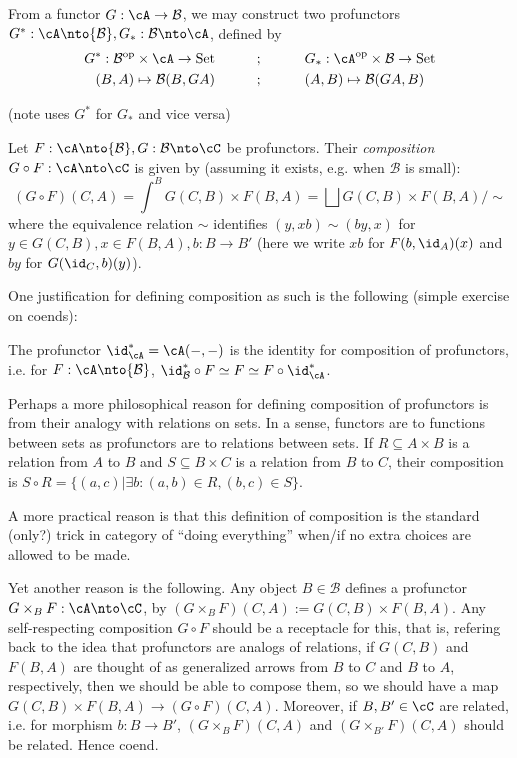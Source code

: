 \documentclass[12pt]{article}
\newcommand{\op}{{\text{op}}}
\newcommand{\cB}{{\mathcal{B}}}
\DeclareMathOperator{\Set}{Set}
\begin{document}
\begin{example}
From a functor $G: \cA \to \cB$,
we may construct two profunctors
$G^*: \cA \nto \cB, G_*: \cB \nto \cA$,
defined by
\begin{align*}
G^* : \cB^\op \times \cA \to \Set
\hspace{30pt}
&;
\hspace{30pt}
G_* : \cA^\op \times \cB \to \Set
\\
(B, A) \mapsto \cB(B, GA)
\hspace{30pt}
&;
\hspace{30pt}
(A, B) \mapsto \cB(GA, B)
\end{align*}

(note \cite{Lawvere} uses $G^*$ for $G_*$ and
vice versa)
\end{example}

\begin{definition}
Let $F: \cA \nto \cB, G: \cB \nto \cC$
be profunctors.
Their \emph{composition}
$G \circ F: \cA \nto \cC$
is given by
(assuming it exists, e.g. when $\cB$ is small):
\[
(G \circ F)(C,A) =
\int^B G(C,B) \times F(B,A)
=
\bigsqcup G(C,B) \times F(B,A) / \sim
\]
where the equivalence relation $\sim$
identifies $(y, xb) \sim (by,x)$
for $y \in G(C,B), x \in F(B,A), b: B \to B'$
(here we write $xb$ for $F(b,\id_A)(x)$
and $by$ for $G(\id_C,b)(y)$).
\end{definition}

One justification for defining composition as such is
the following (simple exercise on coends):
\begin{lemma}
The profunctor $\id_\cA^* = \cA(-,-)$ is
the identity for composition of profunctors,
i.e. for $F: \cA \nto \cB$,
$\id_\cB^* \circ F \simeq F \simeq F \circ \id_\cA^*$.
\end{lemma}

Perhaps a more philosophical reason for defining
composition of profunctors is from
their analogy with relations on sets.
In a sense, functors are to functions between sets
as profunctors are to relations between sets.
If $R \subseteq A \times B$ is a relation from $A$ to $B$
and $S \subseteq B \times C$ is a relation from $B$ to $C$,
their composition is
$S \circ R = \{(a,c) | \exists b: (a,b) \in R, (b,c) \in S\}$.


A more practical reason is that
this definition of composition is the standard (only?) trick
in category of ``doing everything''
when/if no extra choices are allowed to be made.

Yet another reason is the following.
Any object $B \in \cB$ defines a profunctor
$G \times_B F : \cA \nto \cC$,
by $(G \times_B F)(C,A) := G(C,B) \times F(B,A)$.
Any self-respecting composition $G \circ F$
should be a receptacle for this,
that is, refering back to the idea that profunctors are
analogs of relations,
if $G(C,B)$ and $F(B,A)$ are thought of as generalized arrows
from $B$ to $C$ and $B$ to $A$, respectively,
then we should be able to compose them,
so we should have a map
$G(C,B) \times F(B,A) \to (G\circ F)(C,A)$.
Moreover, if $B,B' \in \cC$ are related,
i.e. for morphism $b: B \to B'$,
$(G \times_B F)(C,A)$ and $(G \times_{B'} F)(C,A)$
should be related.
Hence coend.
\end{document}
